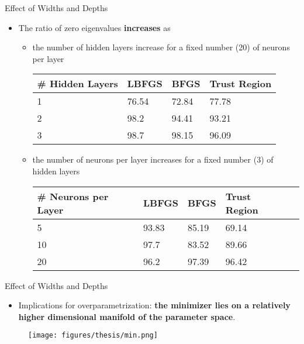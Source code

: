 \documentclass[usenames,dvipsnames]{beamer}
\begin{document}
\begin{frame}{Effect of Widths and Depths}

\begin{itemize}
\item The ratio of zero eigenvalues \textbf{increases} as

\begin{itemize}
\item the number of hidden layers increase for a fixed number (20) of neurons per layer
\begin{center}
\begin{tabular}{@{}llll@{}}
	\toprule
	\# Hidden   Layers &  LBFGS & BFGS  & Trust Region \\ \midrule
	1                         & 76.54 & 72.84 & 77.78        \\
	2                        & 98.2  & 94.41 & 93.21        \\
	3                         & 98.7  & 98.15 & 96.09        \\ \bottomrule
\end{tabular}
\end{center}

\item the number of neurons per layer increases for a fixed number (3) of hidden layers
\begin{center}
	\begin{tabular}{@{}lllll@{}}
		\toprule
		\# Neurons per Layer & LBFGS & BFGS  & Trust Region \\ \midrule
		5                         & 93.83 & 85.19 & 69.14        \\
		10                         & 97.7  & 83.52 & 89.66        \\
		20                        & 96.2  & 97.39 & 96.42        \\ \bottomrule
	\end{tabular}
\end{center}
\end{itemize}
\end{itemize}

\end{frame}


\begin{frame}{Effect of Widths and Depths}
\begin{itemize}
\item Implications for overparametrization: \textbf{the minimizer lies on a relatively higher dimensional manifold of the parameter space}.
\end{itemize}

	\begin{figure}[htbp]
	\centering
	\texttt{[image: figures/thesis/min.png]}
\end{figure}
\end{frame}
\end{document}
